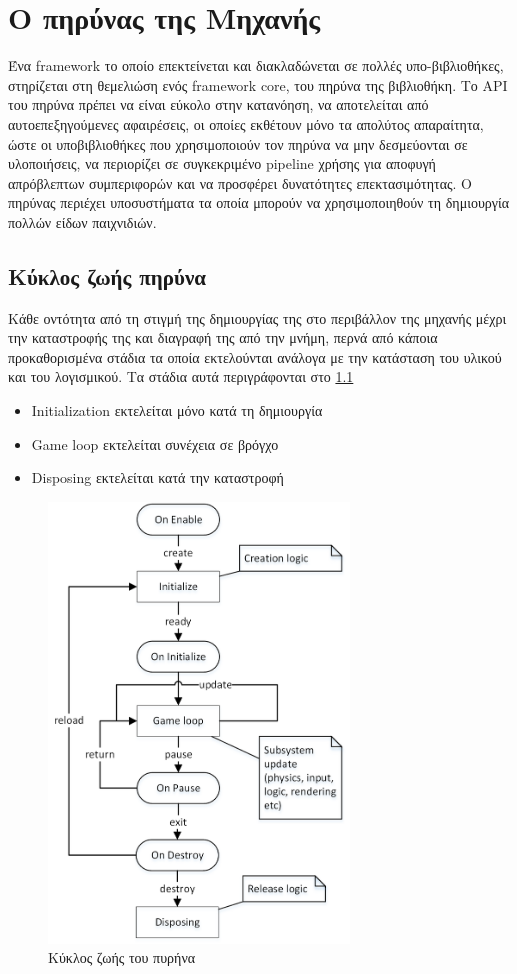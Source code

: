 	\chapter{Ο πηρύνας της Μηχανής}
	
	Ένα framework το οποίο επεκτείνεται και διακλαδώνεται σε πολλές υπο-βιβλιοθήκες, στηρίζεται στη θεμελιώση ενός framework core, του πηρύνα της βιβλιοθήκη. Το \gls{API} του πηρύνα πρέπει να είναι εύκολο στην κατανόηση, να αποτελείται από αυτοεπεξηγούμενες αφαιρέσεις, οι οποίες εκθέτουν μόνο τα απολύτος απαραίτητα, ώστε οι υποβιβλιοθήκες που χρησιμοποιούν τον πηρύνα να μην δεσμεύονται σε υλοποιήσεις, να περιορίζει σε συγκεκριμένο pipeline χρήσης για αποφυγή απρόβλεπτων συμπεριφορών και να προσφέρει δυνατότητες επεκτασιμότητας.  \cite{jaroslav08} Ο πηρύνας περιέχει υποσυστήματα τα οποία μπορούν να χρησιμοποιηθούν τη δημιουργία πολλών είδων παιχνιδιών.
		
	\section{Κύκλος ζωής πηρύνα}	
	Κάθε οντότητα από τη στιγμή της δημιουργίας της στο περιβάλλον της μηχανής μέχρι την καταστροφής της και διαγραφή της από την μνήμη, περνά από κάποια προκαθορισμένα στάδια τα οποία εκτελούνται ανάλογα με την κατάσταση του υλικού και του λογισμικού. Τα στάδια αυτά περιγράφονται στο \ref{fig:corelifecycle}
	
	\begin{itemize}
		\item Initialization εκτελείται μόνο κατά τη δημιουργία
		\item Game loop εκτελείται συνέχεια σε βρόγχο
		\item Disposing εκτελείται κατά την καταστροφή
	\end{itemize}
	
	\begin{figure}[h!]
		\centering
		\includegraphics[width=80mm]{Images/core_lifecycle}
		\caption{Κύκλος ζωής του πυρήνα}
		\label{fig:corelifecycle}
	\end{figure}
		
